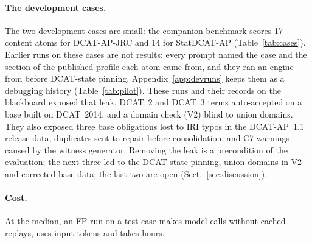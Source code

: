 \paragraph{The development cases.} The two development cases are small: the companion benchmark scores 17 content %
atoms for DCAT-AP-JRC and 14 for StatDCAT-AP (Table~\ref{tab:cases}). 
Earlier runs on these cases are not results: every prompt named the case and the section of the published profile %
each atom came from, and they ran an engine from before DCAT-state pinning. %
Appendix~\ref{app:devruns} keeps them as a debugging history (Table~\ref{tab:pilot}). These runs and their records
on the blackboard exposed that leak, DCAT~2 and DCAT~3 terms auto-accepted on a base built on DCAT~2014, and a %
domain check (V2) blind to union domains. They also exposed three base obligations lost to \ac{IRI} typos in the %
\acs{DCAT-AP}~1.1 release data, duplicates sent to repair before consolidation, and C7 warnings caused by the %
witness generator. 
Removing the leak is a precondition of the evaluation; the next three led to the DCAT-state pinning, union domains
in V2 and corrected base data; the last two are open (Sect.~\ref{sec:discussion}). %

\paragraph{Cost.} At the median, an FP run on a test case makes  model calls without cached
replays, uses  input tokens and takes  hours. 
